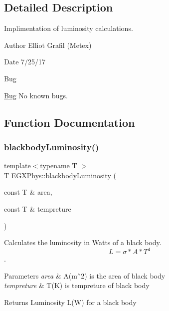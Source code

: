 \subsection{Detailed Description}
Implimentation of luminosity calculations. 

\begin{DoxyAuthor}{Author}
Elliot Grafil (Metex) 
\end{DoxyAuthor}
\begin{DoxyDate}{Date}
7/25/17 
\end{DoxyDate}
\begin{DoxyRefDesc}{Bug}
\item[\hyperlink{bug__bug000004}{Bug}]No known bugs. \end{DoxyRefDesc}


\subsection{Function Documentation}
\mbox{\label{_luminosity_8hpp_file_a909f82edfaed449b44e94788b642ebb8}} 
\subsubsection{\texorpdfstring{blackbody\+Luminosity()}{blackbodyLuminosity()}}
{\footnotesize\ttfamily template$<$typename T $>$ \\
T E\+G\+X\+Phys\+::blackbody\+Luminosity (\begin{DoxyParamCaption}\item[{const T \&}]{area,  }\item[{const T \&}]{tempreture }\end{DoxyParamCaption})}



Calculates the luminosity in Watts of a black body. \[L=\sigma*A*T^4\]. 


\begin{DoxyParams}{Parameters}
{\em area} & A(m$^\wedge$2) is the area of black body \\
\hline
{\em tempreture} & T(\+K) is tempreture of black body \\
\hline
\end{DoxyParams}
\begin{DoxyReturn}{Returns}
Luminosity L(\+W) for a black body 
\end{DoxyReturn}
\mbox{\label{_luminosity_8hpp_file_a6d6865b2aac1bc7c7f06b7c4ac2444e4}} 
